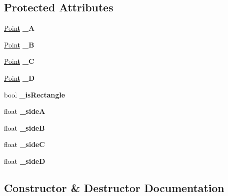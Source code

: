 \subsection*{Protected Attributes}
\begin{DoxyCompactItemize}
\item 
\mbox{\label{class_quadrilateral_a65b6518cd4c2ce27c0e045a7fa99ca13}} 
\mbox{\hyperlink{class_point}{Point}} {\bfseries \+\_\+A}
\item 
\mbox{\label{class_quadrilateral_afff9e71f4d844788f37851c027ed93ab}} 
\mbox{\hyperlink{class_point}{Point}} {\bfseries \+\_\+B}
\item 
\mbox{\label{class_quadrilateral_ade7eb0763a3bcc1323c918942896278a}} 
\mbox{\hyperlink{class_point}{Point}} {\bfseries \+\_\+C}
\item 
\mbox{\label{class_quadrilateral_a7fe1a2df58d2460d043dd33b75bd01de}} 
\mbox{\hyperlink{class_point}{Point}} {\bfseries \+\_\+D}
\item 
\mbox{\label{class_quadrilateral_ae114cfa331a292abe6aa7dc8a57ffd13}} 
bool {\bfseries \+\_\+is\+Rectangle}
\item 
\mbox{\label{class_quadrilateral_a0790e4c00ee6410407876de1d098d020}} 
float {\bfseries \+\_\+sideA}
\item 
\mbox{\label{class_quadrilateral_a3884b48329d7ce808eface74ac0beaa2}} 
float {\bfseries \+\_\+sideB}
\item 
\mbox{\label{class_quadrilateral_aa13935280b228e3b3210d5e9cdb3f937}} 
float {\bfseries \+\_\+sideC}
\item 
\mbox{\label{class_quadrilateral_a5465e5d87329f7261552cf2b033bee38}} 
float {\bfseries \+\_\+sideD}
\end{DoxyCompactItemize}


\subsection{Constructor \& Destructor Documentation}
\mbox{\label{class_quadrilateral_accb7341bd0b9589fc9d672822b5b3f8d}} 
